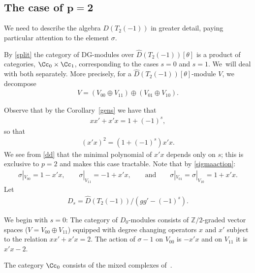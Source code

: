 \subsection[The case of p=2]{The case of $\boldsymbol{p=2}$}
We need to describe the algebra $\widehat{D}(T_2(-1))$ in greater detail, paying particular attention to the element $\sigma$.

By \eqref{split} the category of DG-modules over $\widehat{D}(T_2(-1))[\theta]$ is a product of categories, $\Cc_0\times \Cc_1$, corresponding to the cases $s=0$ and $s=1$. We~will deal with both separately. More precisely, for a $\widehat{D}(T_2(-1))[\theta]$-module $V$, we decompose
\begin{gather}
V=(V_{00}\oplus V_{11})\oplus(V_{01}\oplus V_{10}).
\end{gather}

Observe that by the Corollary~\ref{gens} we have that
\begin{gather}
xx'+x'x=1+(-1)^s,
\end{gather}
so that
\begin{gather}\label{dd}
(x'x)^2=(1+(-1)^s)x'x.
\end{gather}
We see from \eqref{dd} that the minimal polynomial of $x'x$ depends only on $s$; this is exclusive to $p=2$ and makes this case tractable. Note that by \eqref{sigmaaction}:
\begin{gather}\label{sig}
\sigma|_{V_{00}}=1-x'x,\qquad \sigma|_{V_{11}}=-1+x'x,\qquad\text{and}\qquad \sigma|_{V_{01}}=\sigma|_{V_{10}}=1+x'x.
\end{gather} Let
\begin{gather}
D_s=\widehat{D}(T_2(-1))/(gg'-(-1)^s).
\end{gather}

We begin with $s=0$: The category of $D_0$-modules consists of $\mathbb{Z}/2$-graded vector spaces ($V=V_{00}\oplus V_{11}$) equipped with degree changing operators $x$ and $x'$ subject to the relation $xx'+x'x=2$. The action of $\sigma-1$ on $V_{00}$ is $-x'x$ and on $V_{11}$ it is $x'x-2$.

\begin{Lemma}
The category $\Cc_0$ consists of the mixed complexes of~{\rm \cite{kassel}}.
\end{Lemma}

